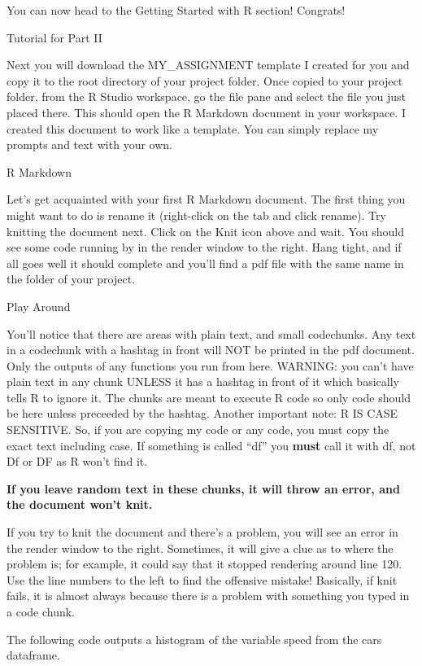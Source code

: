 \documentclass[
]{html}
\theoremstyle{definition}
\theoremstyle{definition}
\theoremstyle{definition}
\theoremstyle{definition}
\theoremstyle{remark}
\begin{document}
You can now head to the Getting Started with R section! Congrats!

Tutorial for Part II

Next you will download the MY\_ASSIGNMENT template I created for you and copy it to the root directory of your project folder. Once copied to your project folder, from the R Studio workspace, go the file pane and select the file you just placed there. This should open the R Markdown document in your workspace. I created this document to work like a template. You can simply replace my prompts and text with your own.

R Markdown

Let's get acquainted with your first R Markdown document. The first thing you might want to do is rename it (right-click on the tab and click rename). Try knitting the document next. Click on the Knit icon above and wait. You should see some code running by in the render window to the right. Hang tight, and if all goes well it should complete and you'll find a pdf file with the same name in the folder of your project.

Play Around

You'll notice that there are areas with plain text, and small codechunks. Any text in a codechunk with a hashtag in front will NOT be printed in the pdf document. Only the outputs of any functions you run from here. WARNING: you can't have plain text in any chunk UNLESS it has a hashtag in front of it which basically tells R to ignore it. The chunks are meant to execute R code so only code should be here unless preceeded by the hashtag. Another important note: R IS CASE SENSITIVE. So, if you are copying my code or any code, you must copy the exact text including case. If something is called ``df'' you \textbf{must} call it with df, not Df or DF as R won't find it.

\textbf{If you leave random text in these chunks, it will throw an error, and the document won't knit.}

If you try to knit the document and there's a problem, you will see an error in the render window to the right. Sometimes, it will give a clue as to where the problem is; for example, it could say that it stopped rendering around line 120. Use the line numbers to the left to find the offensive mistake! Basically, if knit fails, it is almost always because there is a problem with something you typed in a code chunk.

The following code outputs a histogram of the variable speed from the cars dataframe.
\end{document}
